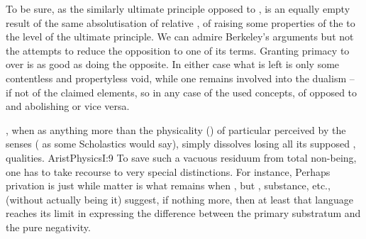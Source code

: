 To be sure,  as the similarly ultimate principle opposed to
, is an equally empty result of the same absolutisation 
of relative , of raising some properties of the   to the level of the ultimate principle.  We can
admire Berkeley's arguments but not the attempts to reduce the opposition to one
of its terms. Granting primacy to  over  is as good as
doing the opposite. In either case what is left is only some
contentless and propertyless void, while one remains involved into
the dualism -- if not of the claimed elements, so in any case of the used
concepts, of  opposed to and abolishing  or vice
versa.


\pa\label{pa:ambigMatter} , when  as anything more than
the physicality () of particular  perceived by the
senses ( as some Scholastics would say), simply dissolves
losing all its supposed , 
 qualities.  \citet{For my definition of matter is just this --
  the primary substratum of each thing, from which it comes to be without
  qualification, and which persists in the result.}{AristPhysics}{I:9} To save
such a vacuous residuum from 
total non-being, one has to take recourse to very special distinctions.
For instance,  Perhaps privation is just  while
matter is what remains when , but ,  substance, etc., (without actually being it)
suggest, if nothing more, then at least
that language reaches its limit in expressing the difference between the primary
substratum and the pure negativity.

